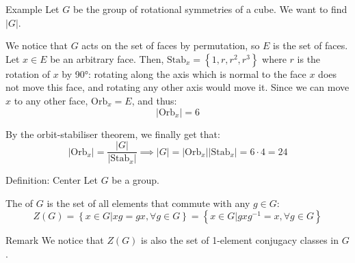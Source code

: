 \documentclass[a4paper]{article}
\begin{document}
\begin{parag}{Example}
    Let $G$ be the group of rotational symmetries of a cube. We want to find $\left|G\right|$.

    We notice that $G$ acts on the set of faces by permutation, so $E$ is the set of faces. Let $x \in E$ be an arbitrary face. Then, $\text{Stab}_x = \left\{1, r, r^2, r^3\right\}$ where $r$ is the rotation of $x$ by 90°: rotating along the axis which is normal to the face $x$ does not move this face, and rotating any other axis would move it. Since we can move $x$ to any other face, $\text{Orb}_x = E$, and thus: 
    \[\left|\text{Orb}_x\right| = 6\]
    
    By the orbit-stabiliser theorem, we finally get that: 
    \[\left|\text{Orb}_x\right| = \frac{\left|G\right|}{\left|\text{Stab}_x\right|} \implies \left|G\right| = \left|\text{Orb}_x\right|\left|\text{Stab}_x\right| = 6\cdot4 = 24\]
\end{parag}

\begin{parag}{Definition: Center}
    Let $G$ be a group.

    The  of $G$ is the set of all elements that commute with any $g \in G$: 
    \[Z\left(G\right) = \left\{x \in G | xg = gx, \forall g \in G\right\} = \left\{x \in G | g x g^{-1} = x, \forall g \in G\right\}\]
    
    \begin{subparag}{Remark}
        We notice that $Z\left(G\right)$ is also the set of 1-element conjugacy classes in $G$.
    \end{subparag}
\end{parag}
\end{document}
